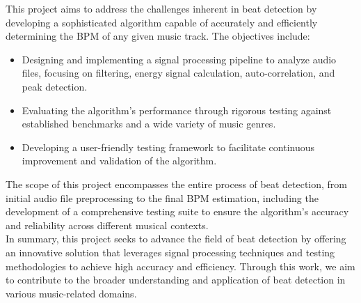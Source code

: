 This project aims to address the challenges inherent in beat detection by developing a sophisticated algorithm capable of accurately and efficiently determining the BPM of any given music track. The objectives include:
\begin{itemize}
    \item Designing and implementing a signal processing pipeline to analyze audio files, focusing on filtering, energy signal calculation, auto-correlation, and peak detection.
    \item Evaluating the algorithm's performance through rigorous testing against established benchmarks and a wide variety of music genres.
    \item Developing a user-friendly testing framework to facilitate continuous improvement and validation of the algorithm.
\end{itemize}

The scope of this project encompasses the entire process of beat detection, from initial audio file preprocessing to the final BPM estimation, including the development of a comprehensive testing suite to ensure the algorithm's accuracy and reliability across different musical contexts. \\

In summary, this project seeks to advance the field of beat detection by offering an innovative solution that leverages signal processing techniques and testing methodologies to achieve high accuracy and efficiency. Through this work, we aim to contribute to the broader understanding and application of beat detection in various music-related domains.
